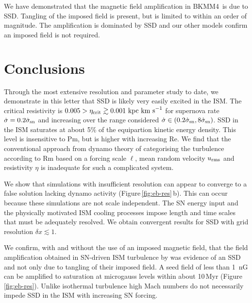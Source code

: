 \documentclass[preprint2]{aastex63}
\newcommand\SNr{\dot\sigma_{\rm sn}}
\newcommand\kpc{~ {\rm kpc}}
\newcommand\pc{~ {\rm pc}}
\newcommand\dx{ {\delta x}}
\newcommand\kms{~ {\rm km~ s}^{-1}}
\newcommand\BKM{{\sf BKMM4}}
\newcommand{\fg}[1]{\textcolor{midgreen}{#1}}
\begin{document}
 \fg{We have demonstrated that the magnetic field amplification in \BKM\ is
 due to SSD. 
 Tangling of the imposed field is present, but is limited to within an
 order of magnitude.
 The amplification is dominated by SSD and our other models 
 confirm an imposed field is not required.
 }

\section{Conclusions}\label{sec:conc}

 \fg{Through the most extensive resolution and parameter study to date, we
 demonstrate in this letter that SSD is likely very easily excited in
 the ISM.
 The critical resistivity is $0.005>\eta_{\rm crit}\gtrsim0.001\kpc\kms$ for 
 supernova rate $\dot \sigma=0.2\SNr$ and increasing over the 
 range considered $\dot \sigma\in(0.2\SNr,8\SNr)$.
 SSD in the ISM saturates at about 5\% of the equipartion kinetic energy
 density.
 This level is insensitive to Pm, but is higher with increasing Re.}
 We find that the conventional approach from dynamo theory of categorising the 
 turbulence according to Rm based on a forcing scale $\ell$, mean random
 velocity $u_{\rm rms}$ and resistivity $\eta$ is inadequate for such a
 complicated system.

 We show that simulations with insufficient resolution can appear to
 converge to a false solution lacking dynamo activity
 (Figure\,\ref{fig:eb-res}\,b). This can occur because these simulations are not
 scale independent. 
 The SN energy input and the physically motivated ISM cooling processes impose
 length and time scales that must be adequately resolved.
 \fg{We obtain convergent results for SSD with grid resolution
 $\dx\lesssim1$.}

 \fg{We confirm, with and without the use of an imposed magnetic field, that
 the field amplification obtained in SN-driven ISM turbulence by \citet{BKMM04}
 was evidence of an SSD and not only due to tangling of their imposed field.}
 A seed field of less than 1~nG can be amplified to saturation at microgauss
 levels within about 10\,Myr (Figure\,\ref{fig:eb-res}). 
 Unlike isothermal turbulence high Mach numbers do not necessarily impede SSD
 in the ISM with increasing SN forcing.
\end{document}
